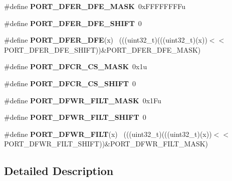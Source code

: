\begin{DoxyCompactItemize}
\item 
\hypertarget{group___p_o_r_t___register___masks_ga450c760a693b115dc630c8a5edb628df}{}\#define {\bfseries P\+O\+R\+T\+\_\+\+D\+F\+E\+R\+\_\+\+D\+F\+E\+\_\+\+M\+A\+S\+K}~0x\+F\+F\+F\+F\+F\+F\+F\+Fu\label{group___p_o_r_t___register___masks_ga450c760a693b115dc630c8a5edb628df}

\item 
\hypertarget{group___p_o_r_t___register___masks_ga7bcd0509509d5a2865efab49eef02c56}{}\#define {\bfseries P\+O\+R\+T\+\_\+\+D\+F\+E\+R\+\_\+\+D\+F\+E\+\_\+\+S\+H\+I\+F\+T}~0\label{group___p_o_r_t___register___masks_ga7bcd0509509d5a2865efab49eef02c56}

\item 
\hypertarget{group___p_o_r_t___register___masks_gacfcb713492555bf46eb37c6739ef836e}{}\#define {\bfseries P\+O\+R\+T\+\_\+\+D\+F\+E\+R\+\_\+\+D\+F\+E}(x)                                              ~(((uint32\+\_\+t)(((uint32\+\_\+t)(x))$<$$<$P\+O\+R\+T\+\_\+\+D\+F\+E\+R\+\_\+\+D\+F\+E\+\_\+\+S\+H\+I\+F\+T))\&P\+O\+R\+T\+\_\+\+D\+F\+E\+R\+\_\+\+D\+F\+E\+\_\+\+M\+A\+S\+K)\label{group___p_o_r_t___register___masks_gacfcb713492555bf46eb37c6739ef836e}

\item 
\hypertarget{group___p_o_r_t___register___masks_gadc66969dfb648b725cd30df406f7a2f9}{}\#define {\bfseries P\+O\+R\+T\+\_\+\+D\+F\+C\+R\+\_\+\+C\+S\+\_\+\+M\+A\+S\+K}~0x1u\label{group___p_o_r_t___register___masks_gadc66969dfb648b725cd30df406f7a2f9}

\item 
\hypertarget{group___p_o_r_t___register___masks_gac739bd97cc0b19198e8daa335c984500}{}\#define {\bfseries P\+O\+R\+T\+\_\+\+D\+F\+C\+R\+\_\+\+C\+S\+\_\+\+S\+H\+I\+F\+T}~0\label{group___p_o_r_t___register___masks_gac739bd97cc0b19198e8daa335c984500}

\item 
\hypertarget{group___p_o_r_t___register___masks_gaf2f0bbe1dea504156dce840fdcb94b74}{}\#define {\bfseries P\+O\+R\+T\+\_\+\+D\+F\+W\+R\+\_\+\+F\+I\+L\+T\+\_\+\+M\+A\+S\+K}~0x1\+Fu\label{group___p_o_r_t___register___masks_gaf2f0bbe1dea504156dce840fdcb94b74}

\item 
\hypertarget{group___p_o_r_t___register___masks_ga9045bd83bc548178d057bf4916c8fe08}{}\#define {\bfseries P\+O\+R\+T\+\_\+\+D\+F\+W\+R\+\_\+\+F\+I\+L\+T\+\_\+\+S\+H\+I\+F\+T}~0\label{group___p_o_r_t___register___masks_ga9045bd83bc548178d057bf4916c8fe08}

\item 
\hypertarget{group___p_o_r_t___register___masks_gad657e805a001c463d29fc307ecd4103e}{}\#define {\bfseries P\+O\+R\+T\+\_\+\+D\+F\+W\+R\+\_\+\+F\+I\+L\+T}(x)                                            ~(((uint32\+\_\+t)(((uint32\+\_\+t)(x))$<$$<$P\+O\+R\+T\+\_\+\+D\+F\+W\+R\+\_\+\+F\+I\+L\+T\+\_\+\+S\+H\+I\+F\+T))\&P\+O\+R\+T\+\_\+\+D\+F\+W\+R\+\_\+\+F\+I\+L\+T\+\_\+\+M\+A\+S\+K)\label{group___p_o_r_t___register___masks_gad657e805a001c463d29fc307ecd4103e}

\end{DoxyCompactItemize}


\subsection{Detailed Description}
